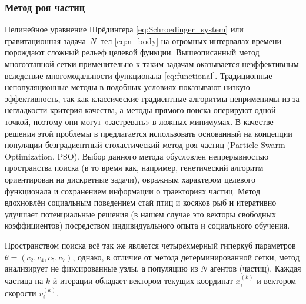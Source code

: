 \subsubsection{Метод роя частиц}
Нелинейное уравнение Шрёдингера \eqref{eq:Schroedinger_system} или гравитационная задача~$N$~тел \eqref{eq:n_body} на огромных интервалах времени порождают сложный рельеф целевой функции. Вышеописанный метод многоэтапной сетки применительно к таким задачам оказывается неэффективным вследствие многомодальности функционала \eqref{eq:functional}. Традиционные непопуляционные методы в подобных условиях показывают низкую эффективность, так как классические градиентные алгоритмы неприменимы из-за негладкости критерия качества, а методы прямого поиска оперируют одной точкой, поэтому они могут «застревать» в ложных минимумах. В качестве решения этой проблемы в \cite{Anastassi2025} предлагается использовать основанный на концепции популяции безградиентный стохастический метод роя частиц (Particle Swarm Optimization, PSO). Выбор данного метода обусловлен непрерывностью пространства поиска (в то время как, например, генетический алгоритм ориентирован на дискретные задачи), овражным характером целевого функционала и сохранением информации о траекториях частиц. Метод вдохновлён социальным поведением стай птиц и косяков рыб и итеративно улучшает потенциальные решения (в нашем случае это векторы свободных коэффициентов) посредством индивидуального опыта и социального обучения. 

Пространством поиска всё так же является четырёхмерный гиперкуб параметров $\theta = (c_2, c_4, c_5, c_7)$, однако, в отличие от метода детерминированной сетки, метод анализирует не фиксированные узлы, а популяцию из $N$ агентов (частиц). Каждая частица на $k$-й итерации обладает вектором текущих координат $x_i^{(k)}$ и вектором скорости $v_i^{(k)}$. 


